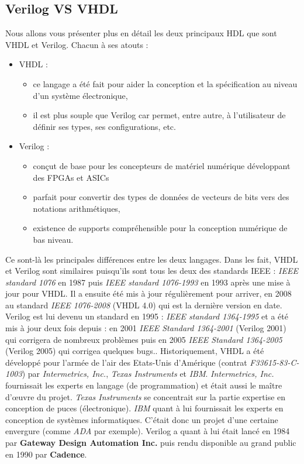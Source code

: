 \subsection{Verilog VS VHDL}
\vspace{15px}
Nous allons vous présenter plus en détail les deux principaux HDL que sont VHDL et Verilog. Chacun à ses atouts :
\begin{itemize}
\item VHDL :
\begin{itemize}
\item ce langage a été fait pour aider la conception et la spécification au niveau d'un système électronique,
\item il est plus souple que Verilog car permet, entre autre, à l'utilisateur de définir ses types, ses configurations, etc.
\end{itemize}
\item Verilog :
\begin{itemize}
\item conçut de base pour les concepteurs de matériel numérique développant des FPGAs et ASICs
\item parfait pour convertir des types de données de vecteurs de bits vers des notations arithmétiques,
\item existence de supports compréhensible pour la conception numérique de bas niveau.
\end{itemize}
\end{itemize}

Ce sont-là les principales différences entre les deux langages. Dans les fait, VHDL et Verilog sont similaires puisqu'ils sont tous les deux des standards IEEE : \textit{IEEE standard 1076} en 1987 puis \textit{IEEE standard 1076-1993} en 1993 après une mise à jour pour VHDL. Il a ensuite été mis à jour régulièrement pour arriver, en 2008 au standard \textit{IEEE 1076-2008} (VHDL 4.0) qui est la dernière version en date. Verilog est lui devenu un standard en 1995 : \textit{IEEE standard 1364-1995} et a été mis à jour deux fois depuis : en 2001  \textit{IEEE Standard 1364-2001} (Verilog 2001) qui corrigera de nombreux problèmes puis en 2005  \textit{IEEE Standard 1364-2005} (Verilog 2005) qui corrigea quelques bugs.. Historiquement, VHDL a été développé pour l'armée de l'air des Etats-Unis d'Amérique (contrat \textit{F33615-83-C-1003}) par \textit{Intermetrics, Inc.}, \textit{Texas Instruments} et \textit{IBM}. \textit{Intermetrics, Inc.}  fournissait les experts en langage (de programmation) et était aussi le maître d'\oe{}uvre du projet. \textit{Texas Instruments} se concentrait sur la partie expertise en conception de puces (électronique). \textit{IBM} quant à lui fournissait les experts en conception de systèmes informatiques. C'était donc un projet d'une certaine envergure (comme \textit{ADA} par exemple). Verilog a quant à lui était lancé en 1984 par \textbf{Gateway Design Automation Inc.}  puis rendu disponible au grand public en 1990 par \textbf{Cadence}.


